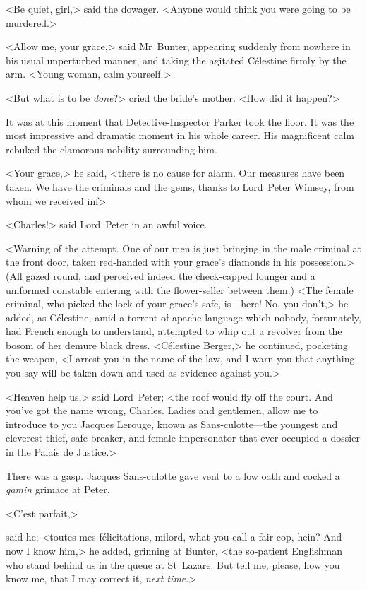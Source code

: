 <Be quiet, girl,> said the dowager. <Anyone would think you were going to be murdered.>

<Allow me, your grace,> said Mr~Bunter, appearing suddenly from nowhere in his usual unperturbed manner, and taking the agitated Célestine firmly by the arm. <Young woman, calm yourself.>

<But what is to be \textit{done}?> cried the bride's mother. <How did it happen?>

It was at this moment that Detective-Inspector Parker took the floor. It was the most impressive and dramatic moment in his whole career. His magnificent calm rebuked the clamorous nobility surrounding him.

<Your grace,> he said, <there is no cause for alarm. Our measures have been taken. We have the criminals and the gems, thanks to Lord~Peter Wimsey, from whom we received inf\longdash>

<Charles!> said Lord~Peter in an awful voice.

<Warning of the attempt. One of our men is just bringing in the male criminal at the front door, taken red-handed with your grace's diamonds in his possession.> (All gazed round, and perceived indeed the check-capped lounger and a uniformed constable entering with the flower-seller between them.) <The female criminal, who picked the lock of your grace's safe, is—here! No, you don't,> he added, as Célestine, amid a torrent of apache language which nobody, fortunately, had French enough to understand, attempted to whip out a revolver from the bosom of her demure black dress. <Célestine Berger,> he continued, pocketing the weapon, <I arrest you in the name of the law, and I warn you that anything you say will be taken down and used as evidence against you.>

<Heaven help us,> said Lord~Peter; <the roof would fly off the court. And you've got the name wrong, Charles. Ladies and gentlemen, allow me to introduce to you Jacques Lerouge, known as Sans-culotte—the youngest and cleverest thief, safe-breaker, and female impersonator that ever occupied a dossier in the Palais de Justice.>

There was a gasp. Jacques Sans-culotte gave vent to a low oath and cocked a \textit{gamin} grimace at Peter.

\begin{french}<C'est parfait,>\end{french} said he; <toutes mes félicitations, milord, what you call a fair cop, hein? And now I know him,> he added, grinning at Bunter, <the so-patient Englishman who stand behind us in the queue at St~Lazare. But tell me, please, how you know me, that I may correct it, \textit{next time}.>

